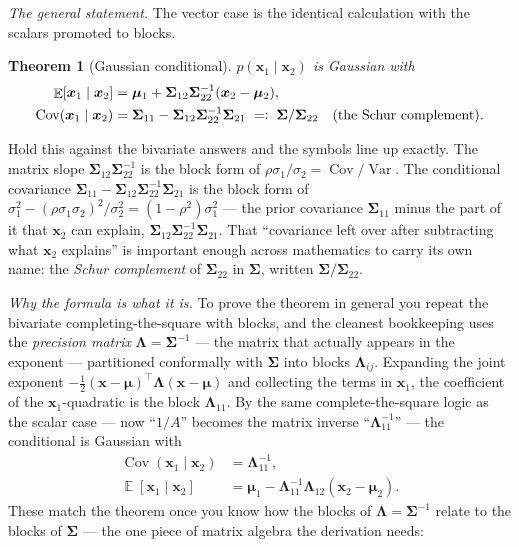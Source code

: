 \documentclass[11pt]{article}
\numberwithin{equation}{section}
\theoremstyle{plain}
\newtheorem{theorem}{Theorem}[section]
\theoremstyle{definition}
\theoremstyle{remark}
\DeclareMathOperator{\E}{\mathbb{E}}
\DeclareMathOperator{\Var}{Var}
\DeclareMathOperator{\Cov}{Cov}
\newcommand{\x}{\bm{x}}
\newcommand{\bmu}{\bm{\mu}}
\newcommand{\bSigma}{\bm{\Sigma}}
\newcommand{\T}{\top}
\begin{document}
\emph{The general statement.} The vector case is the identical calculation with the scalars promoted to blocks.

\begin{theorem}[Gaussian conditional]\label{thm:gausscond}
$p(\x_1 \mid \x_2)$ is Gaussian with
\begin{align}
\E[\x_1 \mid \x_2] &= \bmu_1 + \bSigma_{12}\bSigma_{22}^{-1}(\x_2 - \bmu_2),
\label{eq:condmean}\\
\Cov(\x_1 \mid \x_2) &= \bSigma_{11} - \bSigma_{12}\bSigma_{22}^{-1}\bSigma_{21}
\;=\vcentcolon\; \bSigma / \bSigma_{22}
\quad\text{(the Schur complement)}.
\label{eq:condcov}
\end{align}
\end{theorem}

Hold this against the bivariate answers and the symbols line up exactly. The matrix slope $\bSigma_{12}\bSigma_{22}^{-1}$ is the block form of $\rho\sigma_1/\sigma_2 = \Cov/\Var$. The conditional covariance $\bSigma_{11} - \bSigma_{12}\bSigma_{22}^{-1}\bSigma_{21}$ is the block form of $\sigma_1^2 - (\rho\sigma_1\sigma_2)^2/\sigma_2^2 = (1-\rho^2)\sigma_1^2$ --- the prior covariance $\bSigma_{11}$ minus the part of it that $\x_2$ can explain, $\bSigma_{12}\bSigma_{22}^{-1}\bSigma_{21}$. That ``covariance left over after subtracting what $\x_2$ explains'' is important enough across mathematics to carry its own name: the \emph{Schur complement} of $\bSigma_{22}$ in $\bSigma$, written $\bSigma/\bSigma_{22}$.

\emph{Why the formula is what it is.} To prove the theorem in general you repeat the bivariate completing-the-square with blocks, and the cleanest bookkeeping uses the \emph{precision matrix} $\bm{\Lambda} = \bSigma^{-1}$ --- the matrix that actually appears in the exponent --- partitioned conformally with $\bSigma$ into blocks $\bm{\Lambda}_{ij}$. Expanding the joint exponent $-\tfrac12 (\x - \bmu)^\T \bm{\Lambda} (\x - \bmu)$ and collecting the terms in $\x_1$, the coefficient of the $\x_1$-quadratic is the block $\bm{\Lambda}_{11}$. By the same complete-the-square logic as the scalar case --- now ``$1/A$'' becomes the matrix inverse ``$\bm{\Lambda}_{11}^{-1}$'' --- the conditional is Gaussian with
\begin{align*}
\Cov(\x_1 \mid \x_2)
&= \bm{\Lambda}_{11}^{-1},\\
\E[\x_1 \mid \x_2]
&= \bmu_1 - \bm{\Lambda}_{11}^{-1}\bm{\Lambda}_{12}(\x_2 - \bmu_2).
\end{align*}
These match the theorem once you know how the blocks of $\bm{\Lambda} = \bSigma^{-1}$ relate to the blocks of $\bSigma$ --- the one piece of matrix algebra the derivation needs:
\end{document}
